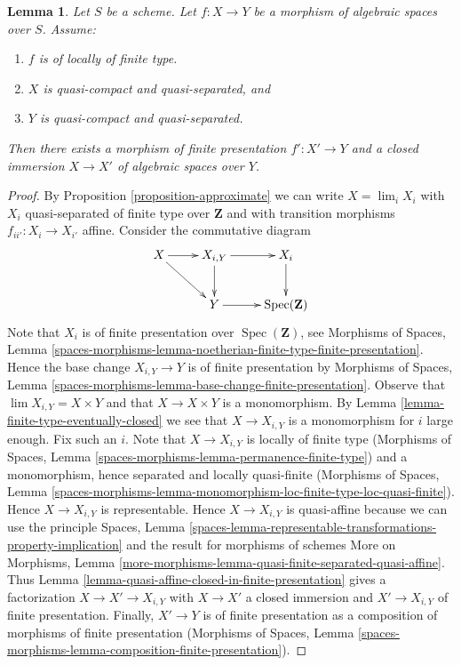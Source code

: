 \documentclass{stacks-project}
\theoremstyle{plain}
\newtheorem{lemma}[subsection]{Lemma}
\theoremstyle{definition}
\theoremstyle{remark}
\numberwithin{equation}{subsection}
\def\lim{\mathop{\mathrm{lim}}\nolimits}
\def\Spec{\mathop{\mathrm{Spec}}}
\begin{document}
\begin{lemma}
\label{lemma-finite-type-closed-in-finite-presentation}
Let $S$ be a scheme. Let $f : X \to Y$ be a morphism of algebraic spaces
over $S$. Assume:
\begin{enumerate}
\item $f$ is of locally of finite type.
\item $X$ is quasi-compact and quasi-separated, and
\item $Y$ is quasi-compact and quasi-separated.
\end{enumerate}
Then there exists a morphism of finite presentation
$f' : X' \to Y$ and a closed immersion $X \to X'$ of
algebraic spaces over $Y$.
\end{lemma}

\begin{proof}
By Proposition \ref{proposition-approximate}
we can write $X = \lim_i X_i$ with $X_i$ quasi-separated of finite type over
$\mathbf{Z}$ and with transition morphisms $f_{ii'} : X_i \to X_{i'}$ affine.
Consider the commutative diagram
$$
\xymatrix{
X \ar[r] \ar[rd] & X_{i, Y} \ar[r] \ar[d] & X_i \ar[d] \\
& Y \ar[r] & \Spec(\mathbf{Z})
}
$$
Note that $X_i$ is of finite presentation over $\Spec(\mathbf{Z})$, see
Morphisms of Spaces, Lemma
\ref{spaces-morphisms-lemma-noetherian-finite-type-finite-presentation}.
Hence the base change $X_{i, Y} \to Y$ is of finite presentation by
Morphisms of Spaces, Lemma
\ref{spaces-morphisms-lemma-base-change-finite-presentation}.
Observe that $\lim X_{i, Y} = X \times Y$ and that $X \to X \times Y$ is a
monomorphism. By Lemma \ref{lemma-finite-type-eventually-closed}
we see that $X \to X_{i, Y}$ is a monomorphism for $i$ large enough.
Fix such an $i$. Note that $X \to X_{i, Y}$ is locally of finite type
(Morphisms of Spaces, Lemma
\ref{spaces-morphisms-lemma-permanence-finite-type})
and a monomorphism, hence separated and locally quasi-finite
(Morphisms of Spaces, Lemma
\ref{spaces-morphisms-lemma-monomorphism-loc-finite-type-loc-quasi-finite}).
Hence $X \to X_{i, Y}$ is representable.
Hence $X \to X_{i, Y}$ is quasi-affine because we can use the
principle Spaces, Lemma
\ref{spaces-lemma-representable-transformations-property-implication}
and the result for morphisms of schemes More on Morphisms, Lemma
\ref{more-morphisms-lemma-quasi-finite-separated-quasi-affine}.
Thus Lemma \ref{lemma-quasi-affine-closed-in-finite-presentation}
gives a factorization $X \to X' \to X_{i, Y}$
with $X \to X'$ a closed immersion and $X' \to X_{i, Y}$ of finite
presentation. Finally, $X' \to Y$ is of finite presentation as a
composition of morphisms of finite presentation
(Morphisms of Spaces, Lemma
\ref{spaces-morphisms-lemma-composition-finite-presentation}).
\end{proof}
\end{document}
